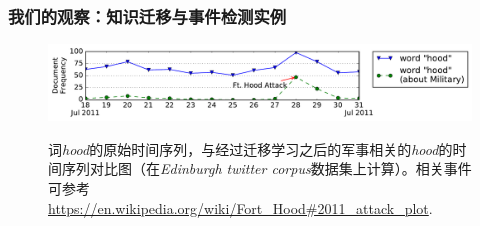 \begin{frame}
\frametitle{我们的观察：知识迁移与事件检测实例}	
\begin{figure}[h]
		\setlength{\abovecaptionskip}{0.cm}
        \setlength{\belowcaptionskip}{0.cm}
        \centering
	\caption{词\textit{hood}的原始时间序列，与经过迁移学习之后的军事相关的\textit{hood}的时间序列对比图（在\textit{Edinburgh twitter corpus}数据集上计算）。相关事件可参考\url{https://en.wikipedia.org/wiki/Fort_Hood\#2011_attack_plot}.}
        \includegraphics[width=1.0\columnwidth]{img/hood.pdf}
        \label{fig:hood}
\end{figure}

\begin{figure}[h]
	\setlength{\abovecaptionskip}{0.cm}
	\setlength{\belowcaptionskip}{0.cm}
	\centering
\end{figure}
\end{frame}

